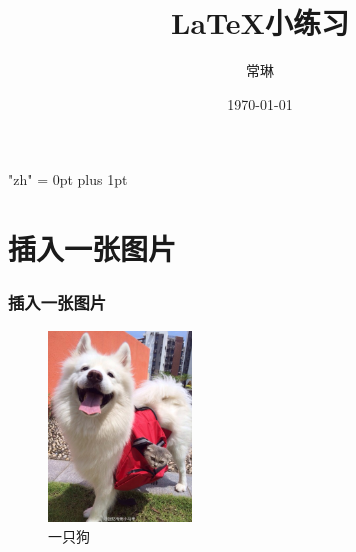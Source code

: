 \documentclass[notheorems,mathserif,table,compress]{beamer}  %
\begin{document}
\XeTeXlinebreaklocale "zh"         %
\XeTeXlinebreakskip = 0pt plus 1pt %

\title[小练习]{\LaTeX 小练习}
\author[常琳]{常琳}
\date{\today}
\frame{ \titlepage }
\section{插入一张图片}
\begin{frame}
  \frametitle{插入一张图片}
  \begin{figure}[!ht]
  \centering\includegraphics[width=1.5in]{dog.jpg}
  \caption{一只狗}
  \end{figure}
\end{frame}
\end{document}
